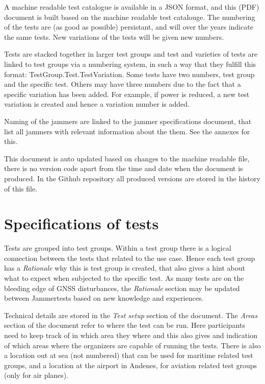 \documentclass[a4paper]{book}
\begin{document}
A machine readable test catalogue is available in a JSON format, and this (PDF) document is built based on the machine readable test catalouge. The numbering of the tests are (as good as possible) persistant, and will over the years indicate the same tests. New variations of the tests will be given new numbers.

Tests are stacked together in larger test groups and test and varieties of tests are linked to test groups via a numbering system, in such a way that they fulfill this format: TestGroup.Test.TestVariation. Some tests have two numbers, test group and the specific test. Others may have three numbers due to the fact that a specific variation has been added. For example, if power is reduced, a new test variation is created and hence a variation number is added.\newline

Naming of the jammers are linked to the jammer specifications document, that list all jammers with relevant information about the them. See the annexes for this.\newline

This document is auto updated based on changes to the machine readable file, there is no version code apart from the time and date when the document is produced. In the Github repository all produced versions are stored in the history of this file.

\section{Specifications of tests}
Tests are grouped into test groups. Within a test group there is a logical connection between the tests that related to the use case. Hence each test group has a \textit{Rationale} why this is test group is created, that also gives a hint about what to expect when subjected to the specific test. As many tests are on the bleeding edge of GNSS disturbances, the \textit{Rationale} section may be updated between Jammertests based on new knowledge and experiences. \newline

Technical details are stored in the \textit{Test setup} section of the document. The \textit{Areas} section of the document refer to where the test can be run. Here participants need to keep track of in which area they where and this also gives and indication of which areas where the organizers are capable of running the tests. There is also a location out at sea (not numbered) that can be used for maritime related test groups, and a location at the airport in Andenes, for aviation related test groups (only for air planes).
\end{document}
